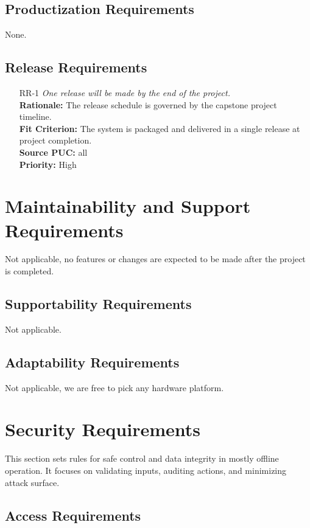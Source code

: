 \documentclass[12pt]{article}
\begin{document}
\subsection{Productization Requirements}

None.

\subsection{Release Requirements}
\begin{itemize}[leftmargin=*]
  \item[RR-1] \emph{One release will be made by the end of the project.}\\[2mm]
        \textbf{Rationale:} The release schedule is governed by the capstone project timeline.\\
        \textbf{Fit Criterion:} The system is packaged and delivered in a single release at project completion.\\
        \textbf{Source PUC:} all \\
        \textbf{Priority:} High
\end{itemize}

\section{Maintainability and Support Requirements}

Not applicable, no features or changes are expected to be made after the
project is completed.

\subsection{Supportability Requirements}

Not applicable.

\subsection{Adaptability Requirements}

Not applicable, we are free to pick any hardware platform.

\section{Security Requirements}
This section sets rules for safe control and data integrity in mostly offline operation.
It focuses on validating inputs, auditing actions, and minimizing attack surface.
\subsection{Access Requirements}
\end{document}
